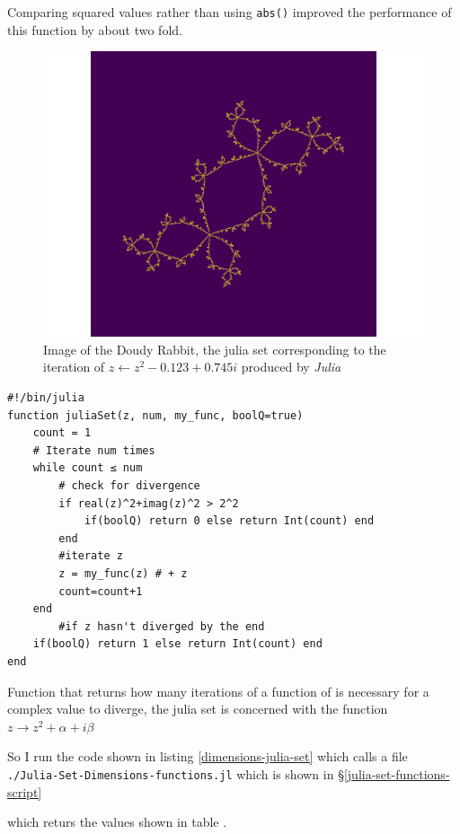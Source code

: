 \documentclass[a4paper,11pt,twoside]{article}
\begin{document}
Comparing squared values rather than using \texttt{abs()} improved the performance of this function by about two fold.

\begin{figure}[htbp]
\centering
\includegraphics[width=12cm]{media/outline-rabbit.png}
\caption{\label{fig:julia-rab}Image of the Doudy Rabbit, the julia set corresponding to the iteration of \(z \leftarrow z^{2} -0.123+0.745i\) produced by \emph{Julia}}
\end{figure}


\begin{listing}[htbp]
\begin{verbatim}
#!/bin/julia
function juliaSet(z, num, my_func, boolQ=true)
    count = 1
    # Iterate num times
    while count ≤ num
        # check for divergence
        if real(z)^2+imag(z)^2 > 2^2
            if(boolQ) return 0 else return Int(count) end
        end
        #iterate z
        z = my_func(z) # + z
        count=count+1
    end
        #if z hasn't diverged by the end
    if(boolQ) return 1 else return Int(count) end
end
\end{verbatim}
\caption{\label{jsetDivFunc}Function that returns how many iterations of a function of is necessary for a complex value to diverge, the julia set is concerned with the function \(z \rightarrow z^{2} + \alpha + i \beta\)}
\end{listing}


So I run the code shown in listing \ref{dimensions-julia-set} which calls a file \texttt{./Julia-Set-Dimensions-functions.jl} which is shown in \S \ref{julia-set-functions-script}

which returs the values shown in table .
\end{document}
